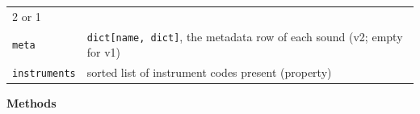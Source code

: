 \documentclass[
  10pt,
]{article}
\begin{document}
\begin{longtable}[]{@{}ll@{}}
\begin{minipage}[t]{0.47\columnwidth}
2 or 1\strut
\end{minipage}\tabularnewline
\begin{minipage}[t]{0.47\columnwidth}\raggedright
\texttt{meta}\strut
\end{minipage} &
\begin{minipage}[t]{0.47\columnwidth}\raggedright
\texttt{dict{[}name,\ dict{]}}, the metadata row of each
sound (v2; empty for v1)\strut
\end{minipage}\tabularnewline
\begin{minipage}[t]{0.47\columnwidth}\raggedright
\texttt{instruments}\strut
\end{minipage} &
\begin{minipage}[t]{0.47\columnwidth}\raggedright
sorted list of instrument codes present (property)\strut
\end{minipage}\tabularnewline
\bottomrule
\end{longtable}

\textbf{Methods}
\end{document}
